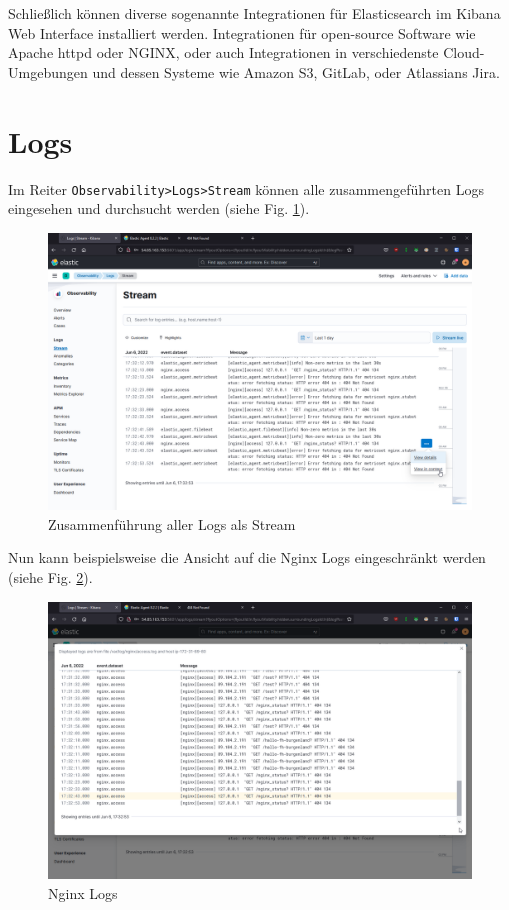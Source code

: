 Schließlich können diverse sogenannte Integrationen \cite{elasticIntegrationsWebsite}
für Elasticsearch im Kibana Web Interface installiert werden.
Integrationen für open-source Software wie Apache httpd oder NGINX,
oder auch Integrationen in verschiedenste Cloud-Umgebungen und dessen
Systeme wie Amazon S3, GitLab, oder Atlassians Jira.

\section{Logs}
Im Reiter \verb|Observability>Logs>Stream| können alle zusammengeführten
Logs eingesehen und durchsucht werden (siehe Fig. \ref{fig:logsStream}).

\begin{figure}[h]
	\centering
	\includegraphics[width=.99\linewidth]{fig/logsStream.png}
	\caption{Zusammenführung aller Logs als Stream}
	\label{fig:logsStream}	
\end{figure}

Nun kann beispielsweise die Ansicht auf die Nginx Logs eingeschränkt werden
(siehe Fig. \ref{fig:logsStreamNginx}).

\begin{figure}[h]
	\centering
	\includegraphics[width=.99\linewidth]{fig/logsStreamNginx.png}
	\caption{Nginx Logs}
	\label{fig:logsStreamNginx}	
\end{figure}

